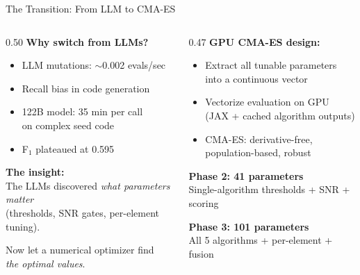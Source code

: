\documentclass[aspectratio=169,12pt]{beamer}
\begin{document}
\begin{frame}{The Transition: From LLM to CMA-ES}
  \begin{columns}[T]
    \begin{column}{0.50\textwidth}
      \textbf{Why switch from LLMs?}
      \begin{itemize}
        \item LLM mutations: $\sim$0.002 evals/sec
        \item Recall bias in code generation
        \item 122B model: 35 min per call\\
              on complex seed code
        \item F$_1$ plateaued at 0.595
      \end{itemize}

      \vspace{0.5em}
      \textbf{The insight:}\\
      The LLMs discovered \emph{what parameters matter}\\
      (thresholds, SNR gates, per-element tuning).

      \vspace{0.3em}
      Now let a numerical optimizer find\\
      \emph{the optimal values}.
    \end{column}
    \begin{column}{0.47\textwidth}
      \textbf{GPU CMA-ES design:}
      \begin{itemize}
        \item Extract all tunable parameters\\
              into a continuous vector
        \item Vectorize evaluation on GPU\\
              (JAX + cached algorithm outputs)
        \item CMA-ES: derivative-free,\\
              population-based, robust
      \end{itemize}

      \vspace{0.5em}
      \textbf{Phase 2: 41 parameters}\\
      {\small Single-algorithm thresholds + SNR + scoring}

      \vspace{0.3em}
      \textbf{Phase 3: 101 parameters}\\
      {\small All 5 algorithms + per-element + fusion}


\end{column}
\end{columns}
\end{frame}
\end{document}
